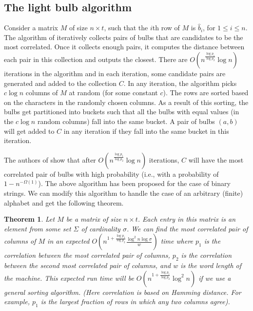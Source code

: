 \documentclass{article}
\newtheorem{theorem}{Theorem}[section]
\theoremstyle{definition}
\theoremstyle{remark}
\begin{document}
\subsection{The light bulb algorithm}
Consider a matrix $M$ of size $n\times t$, such that the $i$th row of $M$ is $\hat{b}_i$, for $1\leq i\leq n$. The algorithm of \cite{RSJ89} iteratively collects pairs of bulbs that are candidates to be the most correlated. Once it collects enough pairs, it computes the distance between each pair in this collection and outputs the closest. There are $O\left (n^{\frac{\log p_1}{\log p_2}}\log n\right )$ iterations in the algorithm and in each iteration, some candidate pairs are generated and added to the collection $C$. In any iteration, the algorithm picks $c\log n$ columns of $M$ at random (for some constant $c$). The rows are sorted based on the characters in the randomly chosen columns. As a result of this sorting, the bulbs get partitioned into buckets such that all the bulbs with equal values (in the $c\log n$ random columns) fall into the same bucket. A pair of bulbs $(a,b)$ will get added to $C$ in any iteration if they fall into the same bucket in this iteration.

The authors of \cite{RSJ89} show that after $O\left (n^{\frac{\log p_1}{\log p_2}}\log n\right )$ iterations, $C$ will have the most correlated pair of bulbs with high probability (i.e., with a probability of $1-n^{-\Omega(1)}$). The above algorithm has been proposed for the case of binary strings. We can modify this algorithm to handle the case of an arbitrary (finite) alphabet and get the following theorem.

\begin{theorem}\label{theorem0}
Let $M$ be a matrix of size $n\times t$. Each entry in this matrix is an element from some set $\Sigma$ of cardinality $\sigma$. We can find the most correlated pair of columns of $M$ in an expected $O\left (n^{1+\frac{\log p_1}{\log p_2}}\frac{\log^2 n\log\sigma}{w}\right )$ time where $p_1$ is the correlation between the most correlated pair of columns, $p_2$ is the correlation between the second most correlated pair of columns, and $w$ is the word length of the machine.  This expected run time will be $O\left (n^{1+\frac{\log p_1}{\log p_2}}\log^2 n\right )$ if we use a general sorting algorithm. (Here correlation is based on Hamming distance. For example, $p_1$ is the largest fraction of rows in which any two columns agree).
\end{theorem}
\end{document}
